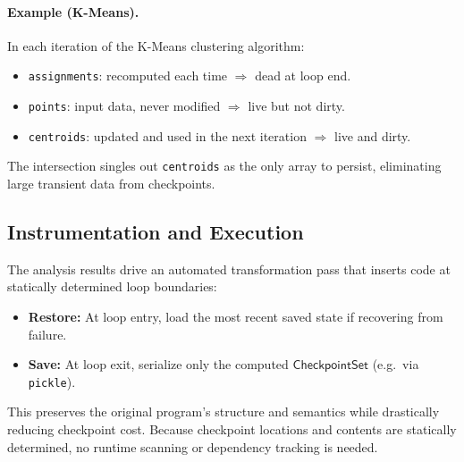 \paragraph{Example (K-Means).}
In each iteration of the K-Means clustering algorithm:
\begin{itemize}
    \item \texttt{assignments}: recomputed each time $\Rightarrow$ dead at loop end.
    \item \texttt{points}: input data, never modified $\Rightarrow$ live but not dirty.
    \item \texttt{centroids}: updated and used in the next iteration $\Rightarrow$ live and dirty.
\end{itemize}
The intersection singles out \texttt{centroids} as the only array to persist, eliminating large transient data from checkpoints.

\subsection{Instrumentation and Execution}

The analysis results drive an automated transformation pass that inserts code at statically determined loop boundaries:
\begin{itemize}
    \item \textbf{Restore:} At loop entry, load the most recent saved state if recovering from failure.
    \item \textbf{Save:} At loop exit, serialize only the computed $\mathsf{CheckpointSet}$ (e.g.\ via \texttt{pickle}).
\end{itemize}
This preserves the original program’s structure and semantics while drastically reducing checkpoint cost. Because checkpoint locations and contents are statically determined, no runtime scanning or dependency tracking is needed.
